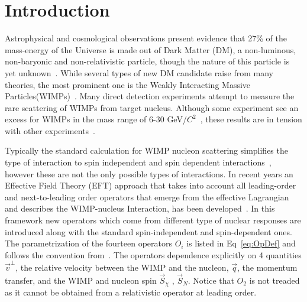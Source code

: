 \section{Introduction}

	Astrophysical and cosmological observations present evidence that 27\% of the mass-energy of the Universe is made out of Dark Matter (DM), a non-luminous, non-baryonic and non-relativistic particle, though the nature of this particle is yet unknown~\cite{Harvey1462}. While several types of new DM candidate raise from many theories, the most prominent one is the Weakly Interacting Massive Particles(WIMPs)~\cite{Bertone:2010zza}. Many  direct detection experiments attempt to measure the rare scattering of WIMPs from target nucleus. Although some experiment see an excess for WIMPs in the mass range of 6-30 GeV/$C^2$~\cite{DAMA,COGENT,CDMSlite,CREST}, these results are in tension with other experiments~\cite{xe100_run_combination,PANDAX,LUXnew}.
	
	 Typically the standard calculation for WIMP nucleon scattering simplifies the type of interaction to spin independent and spin dependent interactions~\cite{LEWIN}, however these are not the only possible types of interactions. In recent years an Effective Field Theory (EFT) approach that takes into account all leading-order and next-to-leading order operators that emerge from the effective Lagrangian and describes the WIMP-nucleus Interaction, has been developed~\cite{Fitzpatrick:2012ib,Anand:MathTools,Fitzpatrick:MathTools}. In this framework new operators which come from different type of nuclear responses are introduced along with the standard spin-independent and spin-dependent ones. The parametrization of the fourteen operators $O_i$ is listed in Eq~\ref{eq:OpDef} and follows the convention from~\cite{Anand:MathTools}. The operators dependence explicitly on 4 quantities $\vec{v}^{\perp}$, the relative velocity between the WIMP and the nucleon, $\vec{q}$, the momentum transfer, and the WIMP and nucleon spin $\vec{S}_\chi$ , $\vec{S}_N$. Notice that $O_2$ is not treaded as it cannot be obtained from a relativistic operator at leading order.   

